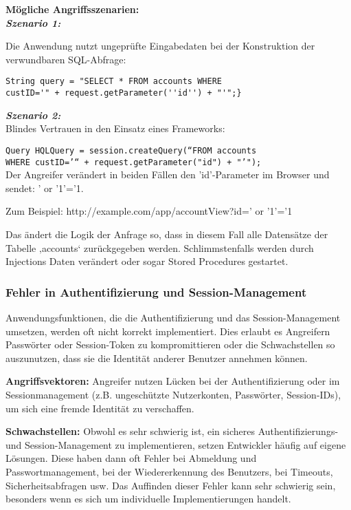 \textbf{Mögliche Angriffsszenarien:}\\

\textbf{\textit{Szenario 1:}}

Die Anwendung nutzt ungeprüfte Eingabedaten bei der Konstruktion der verwundbaren SQL-Abfrage:\\

\begin{lstlisting}
String query = "SELECT * FROM accounts WHERE
custID='" + request.getParameter(''id'') + "'";}
\end{lstlisting}

\textbf{\textit{Szenario 2:}}\\
Blindes Vertrauen in den Einsatz eines Frameworks:

\texttt{Query HQLQuery = session.createQuery(“FROM accounts}\\
\texttt{WHERE custID='“ + request.getParameter("id") + "'");}\\

Der Angreifer verändert in beiden Fällen den 'id'-Parameter im Browser und sendet: ' or '1'='1. 

Zum Beispiel: http://example.com/app/accountView?id=' or '1'='1

Das ändert die Logik der Anfrage so, dass in diesem Fall alle Datensätze der Tabelle ‚accounts‘ zurückgegeben werden. Schlimmstenfalls werden durch Injections Daten verändert oder sogar Stored Procedures gestartet\cite[7]{owasp17top10}.



\subsubsection{Fehler in Authentifizierung und Session-Management}

Anwendungsfunktionen, die die Authentifizierung und das Session-Management umsetzen, werden oft nicht korrekt implementiert. Dies erlaubt es Angreifern Passwörter oder Session-Token  zu kompromittieren oder die Schwachstellen so auszunutzen, dass sie die Identität anderer Benutzer annehmen können\cite[6]{owasp17top10}.

\textbf{Angriffsvektoren:} Angreifer nutzen Lücken bei der Authentifizierung oder im Sessionmanagement (z.B. ungeschützte
Nutzerkonten, Passwörter, Session-IDs), um sich eine fremde Identität zu verschaffen\cite[8]{owasp17top10}.

\textbf{Schwachstellen:} Obwohl es sehr schwierig ist, ein sicheres Authentifizierungs- und Session-Management zu implementieren, setzen Entwickler häufig auf eigene Lösungen. Diese haben dann oft Fehler bei Abmeldung und Passwortmanagement, bei der Wiedererkennung des Benutzers, bei Timeouts, Sicherheitsabfragen usw. Das Auffinden dieser Fehler kann sehr schwierig sein, besonders wenn es sich um individuelle Implementierungen handelt\cite[8]{owasp17top10}.

